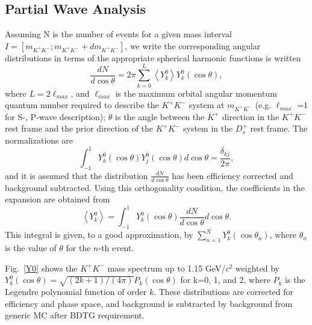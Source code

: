 \subsection{Partial Wave Analysis}
\par{Assuming N is the number of events for a given mass interval $I=[m_{K^{+}K^{-}}; m_{K^{+}K^{-}} + dm_{K^{+}K^{-}}]$, we write the corresponding angular distributions in terms of the appropriate spherical harmonic functions is written
    \begin{equation}
        \frac{dN}{d\cos\theta} = 2\pi\sum_{k=0}^L\left\langle Y_{k}^{0}\right\rangle Y_{k}^{0}(\cos\theta),\label{expansion}
    \end{equation}
    where $L = 2 \ell_{max}$, and $\ell_{max}$ is the maximum orbital angular momentum quantum number required to describe the $K^{+}K^{-}$ system at $m_{K^{+}K^{-}}$ (e.g. $\ell_{max}$ =1 for S-, P-wave description); $\theta$ is the angle between the $K^{+}$ direction in the $K^{+}K^{-}$ rest frame and the prior direction of the $K^{+}K^{-}$ system in the $D_{s}^{+}$ rest frame. 
    The normalizations are 
    \begin{equation}
        \int_{-1}^{1}Y_{k}^{0}(\cos\theta)Y_{j}^{0}(\cos\theta) d\cos\theta  = \frac{\delta_{kj}}{2\pi},\label{sh-normalizations}
    \end{equation}
    and it is  assumed that the distribution $\frac{dN}{d\cos\theta}$ has been efficiency corrected and background subtracted.
    Using this orthogonality condition, the coefficients in the expansion are obtained from 
    \begin{equation}
        \left\langle Y_{k}^{0} \right\rangle = \int_{-1}^{1}Y_{k}^{0}(\cos\theta) \frac{dN}{d\cos\theta} d\cos\theta. \label{expansion-coefficiencies}
    \end{equation}
    This integral is given, to a good approximation, by $\sum_{n=1}^{N}Y_{k}^{0}(\cos\theta_{n})$, where $\theta_{n}$ is the value of $\theta$ for the $n$-th event.
    
    Fig.~\ref{Y0} shows the $K^{+}K^{-}$ mass spectrum up to 1.15 GeV/$c^{2}$ weighted by $Y_{k}^{0}(\cos\theta) = \sqrt{(2k+1)/(4\pi)}P_{k}(\cos\theta)$ for k=0, 1, and 2, where $P_{k}$ is the Legendre polynomial function of order $k$. These distributions are corrected for efficiency and phase space, and background is subtracted by background from generic MC after BDTG requirement.
    
}
